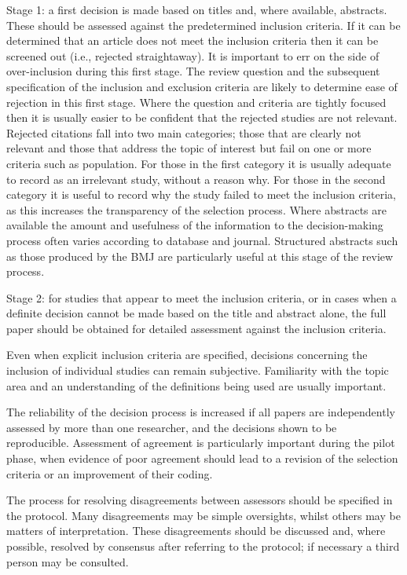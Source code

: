 \documentclass[
  11pt,
  a4paper,
  DIV=11,
  numbers=noendperiod]{scrreprt}
\begin{document}
Stage 1: a first decision is made based on titles and, where available,
abstracts. These should be assessed against the predetermined inclusion
criteria. If it can be determined that an article does not meet the
inclusion criteria then it can be screened out (i.e., rejected
straightaway). It is important to err on the side of over-inclusion
during this first stage. The review question and the subsequent
specification of the inclusion and exclusion criteria are likely to
determine ease of rejection in this first stage. Where the question and
criteria are tightly focused then it is usually easier to be confident
that the rejected studies are not relevant. Rejected citations fall into
two main categories; those that are clearly not relevant and those that
address the topic of interest but fail on one or more criteria such as
population. For those in the first category it is usually adequate to
record as an irrelevant study, without a reason why. For those in the
second category it is useful to record why the study failed to meet the
inclusion criteria, as this increases the transparency of the selection
process. Where abstracts are available the amount and usefulness of the
information to the decision-making process often varies according to
database and journal. Structured abstracts such as those produced by the
BMJ are particularly useful at this stage of the review process.

Stage 2: for studies that appear to meet the inclusion criteria, or in
cases when a definite decision cannot be made based on the title and
abstract alone, the full paper should be obtained for detailed
assessment against the inclusion criteria.

Even when explicit inclusion criteria are specified, decisions
concerning the inclusion of individual studies can remain subjective.
Familiarity with the topic area and an understanding of the definitions
being used are usually important.

The reliability of the decision process is increased if all papers are
independently assessed by more than one researcher, and the decisions
shown to be reproducible. Assessment of agreement is particularly
important during the pilot phase, when evidence of poor agreement should
lead to a revision of the selection criteria or an improvement of their
coding.

The process for resolving disagreements between assessors should be
specified in the protocol. Many disagreements may be simple oversights,
whilst others may be matters of interpretation. These disagreements
should be discussed and, where possible, resolved by consensus after
referring to the protocol; if necessary a third person may be consulted.
\end{document}
